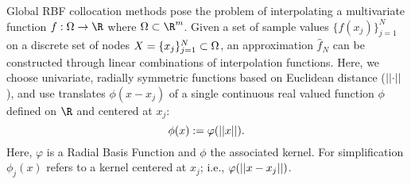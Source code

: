 Global RBF collocation methods pose the problem of interpolating a multivariate function $f : \domain
    \rightarrow \R$ where $\domain \subset \R^m$. Given a set of sample values
    $\{f(x_j)\}_{j=1}^{N}$ on a discrete set of nodes $X = \{x_j\}_{j=1}^{N}
    \subset \Omega$, an approximation $\hat{f}_N$ can be constructed through
    linear combinations of interpolation functions. Here, we choose univariate,
    radially symmetric functions based on Euclidean distance ($\left|\left|\cdot\right|\right|$), and use
    translates $\phi(x-x_j)$ of a single continuous real
    valued function $\phi$ defined on $\R$ and centered at $x_j$:
         \begin{equation*} 
         \phi(x) := \varphi(\left|\left|x\right|\right|).
         \end{equation*} 
    Here, $\varphi$ is a
    Radial Basis Function and $\phi$ the
    associated kernel. For simplification $\phi_j(x)$ refers to a kernel centered at $x_j$; i.e., $\varphi(\left|\left|x-x_j\right|\right|)$.


